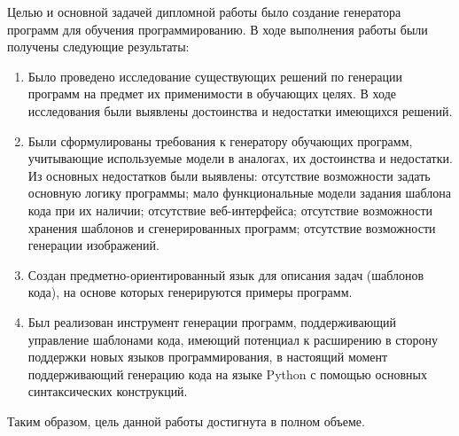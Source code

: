 
Целью и основной задачей дипломной работы было создание генератора программ для обучения
программированию. В ходе выполнения работы были получены следующие результаты:

\begin{enumerate}
    \item Было проведено исследование существующих решений по генерации программ на
          предмет их применимости в обучающих целях. В ходе исследования были выявлены достоинства и
          недостатки имеющихся решений.
    \item Были сформулированы требования к генератору обучающих программ, учитывающие используемые
          модели в аналогах, их достоинства и недостатки. Из основных недостатков были выявлены: отсутствие возможности
          задать основную логику программы; мало функциональные модели задания шаблона кода при их
          наличии; отсутствие веб-интерфейса; отсутствие возможности хранения шаблонов и
          сгенерированных программ; отсутствие возможности генерации изображений.
    \item Создан предметно-ориентированный язык для описания задач (шаблонов кода), на основе которых генерируются примеры программ.
    \item Был реализован инструмент генерации программ, поддерживающий управление
          шаблонами кода, имеющий потенциал к расширению в сторону поддержки новых языков
          программирования, в настоящий момент поддерживающий генерацию кода на языке Python
          с помощью основных синтаксических конструкций.
\end{enumerate}

Таким образом, цель данной работы достигнута в полном объеме.